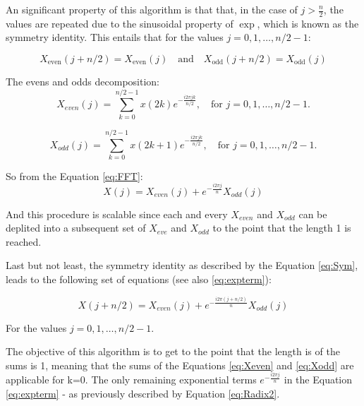 {An significant property of this algorithm is that that, in the case of \( j > \frac{n}{2} \), the values are repeated due to the sinusoidal property of \( \exp \), which is known as the symmetry identity. This entails that for the values \( j = 0,1,\dots,n/2-1 \):

\begin{equation}
	X_{\text{even}}(j + n/2) = X_{\text{even}}(j) \quad \text{and} \quad X_{\text{odd}}(j + n/2) = X_{\text{odd}}(j)
	\label{eq:Sym}
\end{equation}


The evens and odds decomposition:
\begin{equation}
    X_{even}(j) = \sum_{k=0}^{n/2-1} x(2k) e^{ - \frac{i 2\pi jk}{n/2} }, \quad \text{for } j = 0,1,\dots,n/2-1.
    \label{eq:Xeven}  
\end{equation}

\begin{equation}
    X_{odd}(j) =  \sum_{k=0}^{n/2-1} x(2k+1) e^{ - \frac{i 2\pi jk}{n/2} }, \quad \text{for } j = 0,1,\dots,n/2-1.
    \label{eq:Xodd}
\end{equation}

So from the Equation \eqref{eq:FFT}:
\begin{equation}
    X(j) =  X_{even}(j) + e^{- \frac{i 2\pi j}{n}} X_{odd}(j)
    \label{eq:expterm}
\end{equation}

And this procedure is scalable since each and every \( X_{even} \) and \( X_{odd} \) can be deplited into a subsequent set of \( X_{eve} \) and \( X_{odd} \) to the point that the length 1 is reached.

Last but not least, the symmetry identity as described by the Equation \eqref{eq:Sym}, leads to the following set of equations (see also \eqref{eq:expterm}):

\begin{equation}
    X(j+n/2) =  X_{even}(j) + e^{- \frac{i 2\pi (j+n/2)}{n}} X_{odd}(j)
\end{equation}

For the values \( j = 0,1,\dots,n/2-1 \).

The objective of this algorithm is to get to the point that the length is of the sums is 1, meaning that the sums of the Equations \eqref{eq:Xeven} and \eqref{eq:Xodd} are applicable for k=0. The only  remaining exponential terms  \( e^{- \frac{i 2\pi j}{n}} \) in the Equation \eqref{eq:expterm} - as previously described by Equation \eqref{eq:Radix2}.

}
